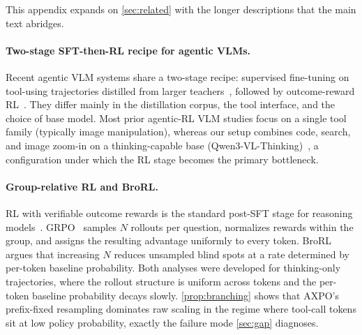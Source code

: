 \documentclass{llmxive}
\begin{document}
This appendix expands on \autoref{sec:related} with the longer descriptions that the main text abridges.

\paragraph{Two-stage SFT-then-RL recipe for agentic VLMs.}
Recent agentic VLM systems share a two-stage recipe: supervised fine-tuning on tool-using trajectories distilled from larger teachers~\citep{FireAct, AgentDistill}, followed by outcome-reward RL~\citep{pyvision-rl, deepeyesv2, deepeyes}. They differ mainly in the distillation corpus, the tool interface, and the choice of base model. Most prior agentic-RL VLM studies focus on a single tool family (typically image manipulation), whereas our setup combines code, search, and image zoom-in on a thinking-capable base (Qwen3-VL-Thinking)~\citep{Qwen3VL}, a configuration under which the RL stage becomes the primary bottleneck.

\paragraph{Group-relative RL and BroRL.}
RL with verifiable outcome rewards is the standard post-SFT stage for reasoning models~\citep{r1, o1}. GRPO~\citep{GRPO, DAPO, prorl} samples $N$ rollouts per question, normalizes rewards within the group, and assigns the resulting advantage uniformly to every token. BroRL~\citep{brorl} argues that increasing $N$ reduces unsampled blind spots at a rate determined by per-token baseline probability. Both analyses were developed for thinking-only trajectories, where the rollout structure is uniform across tokens and the per-token baseline probability decays slowly. \autoref{prop:branching} shows that AXPO's prefix-fixed resampling dominates raw scaling in the regime where tool-call tokens sit at low policy probability, exactly the failure mode \autoref{sec:gap} diagnoses.
\end{document}
